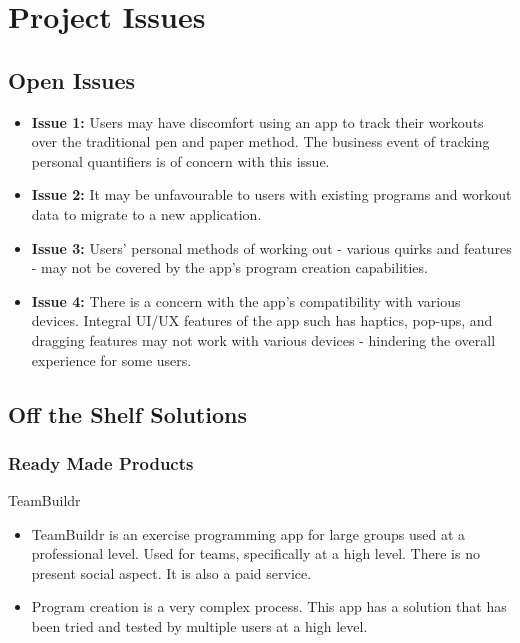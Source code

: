 \documentclass[12pt]{article}
\begin{document}
	\newpage
	
	\section{Project Issues}
		\subsection{Open Issues}
			\begin{itemize}
				\item \textbf{Issue 1:} Users may have discomfort using an app to track their workouts over the traditional pen and paper method. The business event of tracking personal quantifiers is of concern with this issue.
				
				\item \textbf{Issue 2:} It may be unfavourable to users with existing programs and workout data to migrate to a new application.
				
				\item \textbf{Issue 3:} Users' personal methods of working out - various quirks and features - may not be covered by the app's program creation capabilities.
				
				\item \textbf{Issue 4:} There is a concern with the app’s compatibility with various devices. Integral UI/UX features of the app such has haptics, pop-ups, and dragging features may not work with various devices - hindering the overall experience for some users.
				
			\end{itemize}
		
		\subsection{Off the Shelf Solutions}
			\subsubsection{Ready Made Products}
		
				\noindent TeamBuildr
				\begin{itemize}
				\item TeamBuildr is an exercise programming app for large groups used at a professional level. Used for teams, specifically at a high level. There is no present social aspect. It is also a paid service.
				\item Program creation is a very complex process. This app has a solution that has been tried and tested by multiple users at a high level. 
				\end{itemize}
				
\end{document}

